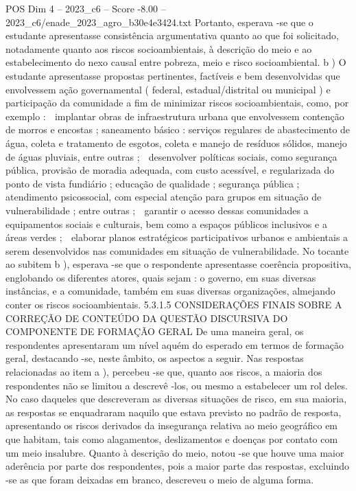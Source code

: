 \begin{textsample}{POS Dim 4 – 2023\_c6 – Score -8.00 – 2023\_c6/enade\_2023\_agro\_b30e4e3424.txt}
Portanto, esperava -se que o estudante apresentasse consistência argumentativa quanto ao que foi solicitado, notadamente quanto aos riscos socioambientais, à descrição do meio e ao estabelecimento do nexo causal entre pobreza, meio e risco socioambiental. b ) O estudante apresentasse propostas pertinentes, factíveis e bem desenvolvidas que envolvessem ação governamental ( federal, estadual/distrital ou municipal ) e participação da comunidade a fim de minimizar riscos socioambientais, como, por exemplo :  implantar obras de infraestrutura urbana que envolvessem contenção de morros e encostas ; saneamento básico : serviços regulares de abastecimento de água, coleta e tratamento de esgotos, coleta e manejo de resíduos sólidos, manejo de águas pluviais, entre outras ;  desenvolver políticas sociais, como segurança pública, provisão de moradia adequada, com custo acessível, e regularizada do ponto de vista fundiário ; educação de qualidade ; segurança pública ; atendimento psicossocial, com especial atenção para grupos em situação de vulnerabilidade ; entre outras ;  garantir o acesso dessas comunidades a equipamentos sociais e culturais, bem como a espaços públicos inclusivos e a áreas verdes ;  elaborar planos estratégicos participativos urbanos e ambientais a serem desenvolvidos nas comunidades em situação de vulnerabilidade.
No tocante ao subitem b ), esperava -se que o respondente apresentasse coerência propositiva, englobando os diferentes atores, quais sejam : o governo, em suas diversas instâncias, e a comunidade, também em suas diversas organizações, almejando conter os riscos socioambientais. 5.3.1.5 CONSIDERAÇÕES FINAIS SOBRE A CORREÇÃO DE CONTEÚDO DA QUESTÃO DISCURSIVA DO COMPONENTE DE FORMAÇÃO GERAL De uma maneira geral, os respondentes apresentaram um nível aquém do esperado em termos de formação geral, destacando -se, neste âmbito, os aspectos a seguir.
Nas respostas relacionadas ao item a ), percebeu -se que, quanto aos riscos, a maioria dos respondentes não se limitou a descrevê -los, ou mesmo a estabelecer um rol deles.
No caso daqueles que descreveram as diversas situações de risco, em sua maioria, as respostas se enquadraram naquilo que estava previsto no padrão de resposta, apresentando os riscos derivados da insegurança relativa ao meio geográfico em que habitam, tais como alagamentos, deslizamentos e doenças por contato com um meio insalubre.
Quanto à descrição do meio, notou -se que houve uma maior aderência por parte dos respondentes, pois a maior parte das respostas, excluindo -se as que foram deixadas em branco, descreveu o meio de alguma forma.

\end{textsample}
